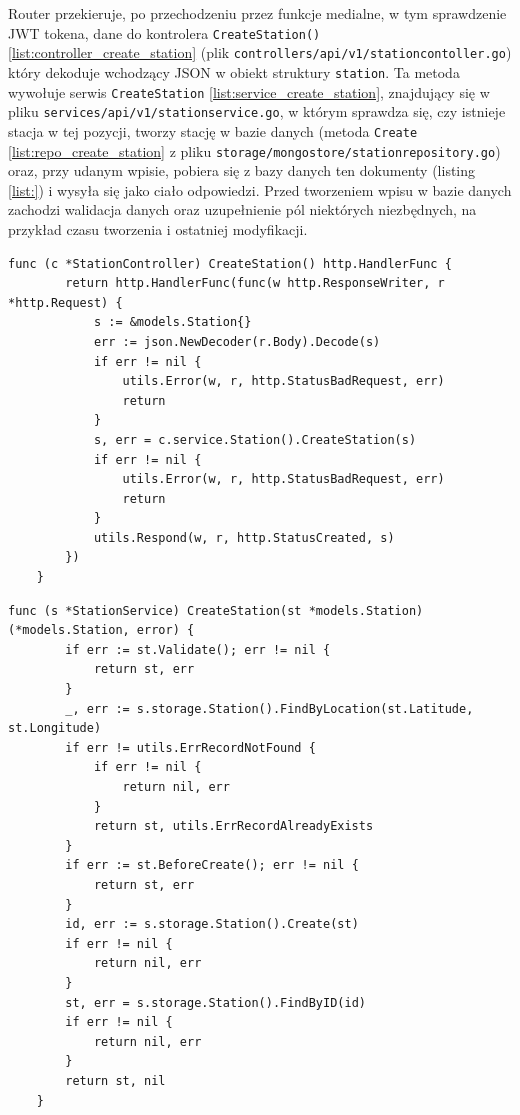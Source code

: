 Router przekieruje, po przechodzeniu przez funkcje medialne, w tym sprawdzenie JWT tokena, dane do kontrolera \texttt{CreateStation()} \ref{list:controller_create_station} (plik \texttt{controllers/api/v1/stationcontoller.go}) który dekoduje wchodzący JSON w obiekt struktury \texttt{station}.
Ta metoda wywołuje serwis \texttt{CreateStation} \ref{list:service_create_station}, znajdujący się w pliku \texttt{services/api/v1/stationservice.go}, w którym sprawdza się, czy istnieje stacja w tej pozycji, tworzy stację w bazie danych (metoda \texttt{Create} \ref{list:repo_create_station} z pliku \texttt{storage/mongostore/stationrepository.go}) oraz, przy udanym wpisie, pobiera się z bazy danych ten dokumenty (listing \ref{list:}) i wysyła się jako ciało odpowiedzi.
Przed tworzeniem wpisu w bazie danych zachodzi walidacja danych oraz uzupełnienie pól niektórych niezbędnych, na przykład czasu tworzenia i ostatniej modyfikacji.
\begin{lstlisting}[label=list:controller_create_station,caption=Kontroler tworzenia stacji ładowniczej,basicstyle=\tiny\ttfamily]
    func (c *StationController) CreateStation() http.HandlerFunc {
        return http.HandlerFunc(func(w http.ResponseWriter, r *http.Request) {
            s := &models.Station{}
            err := json.NewDecoder(r.Body).Decode(s)
            if err != nil {
                utils.Error(w, r, http.StatusBadRequest, err)
                return
            }
            s, err = c.service.Station().CreateStation(s)
            if err != nil {
                utils.Error(w, r, http.StatusBadRequest, err)
                return
            }
            utils.Respond(w, r, http.StatusCreated, s)
        })
    }
\end{lstlisting}

\begin{lstlisting}[label=list:service_create_station,caption=Serwis tworzenia stacji ładowniczej,basicstyle=\tiny\ttfamily]
    func (s *StationService) CreateStation(st *models.Station) (*models.Station, error) {
        if err := st.Validate(); err != nil {
            return st, err
        }
        _, err := s.storage.Station().FindByLocation(st.Latitude, st.Longitude)
        if err != utils.ErrRecordNotFound {
            if err != nil {
                return nil, err
            }
            return st, utils.ErrRecordAlreadyExists
        }
        if err := st.BeforeCreate(); err != nil {
            return st, err
        }
        id, err := s.storage.Station().Create(st)
        if err != nil {
            return nil, err
        }
        st, err = s.storage.Station().FindByID(id)
        if err != nil {
            return nil, err
        }
        return st, nil
    }
\end{lstlisting}

